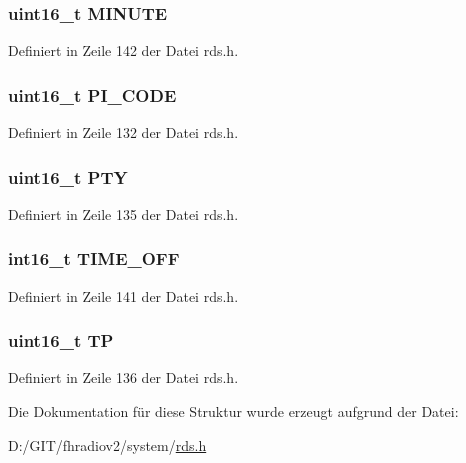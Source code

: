 \subsubsection[{M\+I\+N\+U\+T\+E}]{\setlength{\rightskip}{0pt plus 5cm}uint16\+\_\+t M\+I\+N\+U\+T\+E}\label{structgroup__4a_a4377c294f04582b75e2fcd4134fdeb46}


Definiert in Zeile 142 der Datei rds.\+h.

\hypertarget{structgroup__4a_a5cd9b1f6413028425796c1129aa8fd87}{}
\subsubsection[{P\+I\+\_\+\+C\+O\+D\+E}]{\setlength{\rightskip}{0pt plus 5cm}uint16\+\_\+t P\+I\+\_\+\+C\+O\+D\+E}\label{structgroup__4a_a5cd9b1f6413028425796c1129aa8fd87}


Definiert in Zeile 132 der Datei rds.\+h.

\hypertarget{structgroup__4a_a0474967478fbbc2c71b800d2e0132d45}{}
\subsubsection[{P\+T\+Y}]{\setlength{\rightskip}{0pt plus 5cm}uint16\+\_\+t P\+T\+Y}\label{structgroup__4a_a0474967478fbbc2c71b800d2e0132d45}


Definiert in Zeile 135 der Datei rds.\+h.

\hypertarget{structgroup__4a_ad17cf07501152f576f64d6bf9d06b453}{}
\subsubsection[{T\+I\+M\+E\+\_\+\+O\+F\+F}]{\setlength{\rightskip}{0pt plus 5cm}int16\+\_\+t T\+I\+M\+E\+\_\+\+O\+F\+F}\label{structgroup__4a_ad17cf07501152f576f64d6bf9d06b453}


Definiert in Zeile 141 der Datei rds.\+h.

\hypertarget{structgroup__4a_ab9e634c63b0d95a96716d5f6d7f06d72}{}
\subsubsection[{T\+P}]{\setlength{\rightskip}{0pt plus 5cm}uint16\+\_\+t T\+P}\label{structgroup__4a_ab9e634c63b0d95a96716d5f6d7f06d72}


Definiert in Zeile 136 der Datei rds.\+h.



Die Dokumentation für diese Struktur wurde erzeugt aufgrund der Datei\+:\begin{DoxyCompactItemize}
\item 
D\+:/\+G\+I\+T/fhradiov2/system/\hyperlink{rds_8h}{rds.\+h}\end{DoxyCompactItemize}
